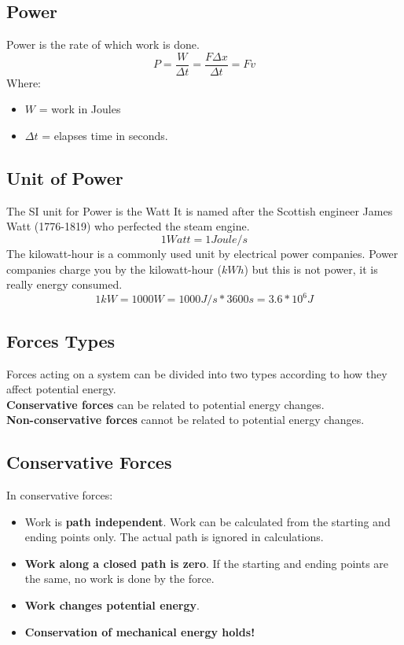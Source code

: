 \subsection{Power}
Power is the rate of which work is done. \[P=\frac{W}{\Delta t}=\frac{F\Delta x}{\Delta t} = Fv\] Where:
\begin{itemize}
	\item $W$ = work in Joules
	\item $\Delta t$ = elapses time in seconds.
\end{itemize}

\subsection{Unit of Power}
The SI unit for Power is the Watt It is named after the Scottish engineer James Watt (1776-1819) who perfected the steam engine. \[1 Watt = 1 Joule/s\] The kilowatt-hour is a commonly used unit by electrical power companies. Power companies charge you by the kilowatt-hour ($kWh$) but this is not power, it is really energy consumed. \[1kW = 1000W=1000J/s*3600s=3.6*10^6J\]

\subsection{Forces Types}
Forces acting on a system can be divided into two types according to how they affect potential energy. \\\textbf{Conservative forces} can be related to potential energy changes. \\\textbf{Non-conservative forces} cannot be related to potential energy changes.

\subsection{Conservative Forces}
In conservative forces:
\begin{itemize}
	\item Work is \textbf{path independent}. Work can be calculated from the starting and ending points only. The actual path is ignored in calculations.
	\item \textbf{Work along a closed path is zero}. If the starting and ending points are the same, no work is done by the force.
	\item \textbf{Work changes potential energy}.
	\item \textbf{Conservation of mechanical energy holds!}
\end{itemize}

